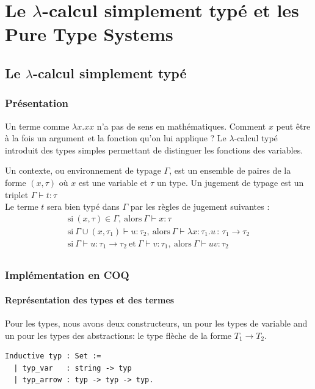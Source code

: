 \documentclass[11pt]{book}
\begin{document}
\chapter{Le $\lambda$-calcul simplement typé et les Pure Type Systems}
\section{Le $\lambda$-calcul simplement typé}
\subsection{Présentation}
Un terme comme $\lambda x.xx$ n'a pas de sens en mathématiques. Comment $x$ peut être à la fois un argument et la fonction qu'on
lui applique ? Le $\lambda$-calcul typé introduit des types simples permettant de distinguer les fonctions des variables.

Un contexte, ou environnement de typage $\Gamma$, est un ensemble de paires de la forme 
$( x , \tau )$  où $x$ est une variable et $\tau$ un type.
 Un jugement de typage est un triplet $\Gamma \vdash t:\tau$  \\

 Le terme $t$ sera bien typé dans $\Gamma$  par les règles de jugement suivantes :
\begin{gather*}
  \mathrm{si}\ (x,\tau ) \in \Gamma  ,\  \mathrm{alors}\ \Gamma \vdash x:\tau  \\
  \mathrm{si}\  \Gamma \cup (x,\tau _{1})\vdash u:\tau _{2},\  \mathrm{alors}\ \Gamma \vdash \lambda x\!:\!\tau _{1}.u\,:\,\tau _{1}\rightarrow \tau _{2} \\
  \mathrm{si}\ \Gamma \vdash u:\tau _{1}\rightarrow \tau _{2}\ \mathrm{et}\ \Gamma \vdash v:\tau _{1},\  
    \mathrm{alors}\  \Gamma \vdash uv:\tau _{2} \\ 
\end{gather*}

\subsection{Implémentation en COQ}
\subsubsection{Représentation des types et des termes}
Pour les types, nous avons deux constructeurs, un pour les types de variable and un
 pour les types des abstractions: le type flèche de la forme  $T_1 \rightarrow T_2$.

\begin{Verbatim}
Inductive typ : Set :=
  | typ_var   : string -> typ
  | typ_arrow : typ -> typ -> typ.
\end{Verbatim}
\end{document}
